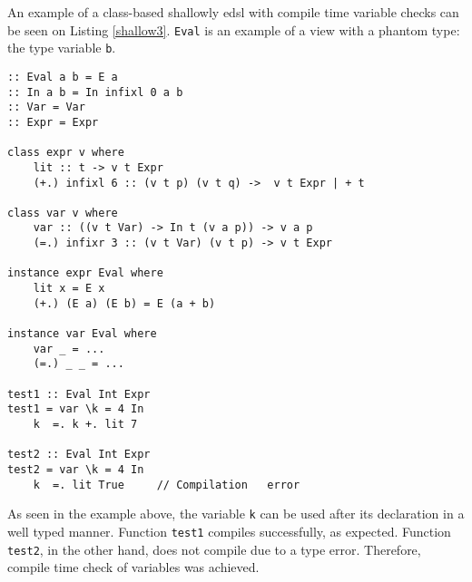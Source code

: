 An example of a class-based shallowly \ac{edsl} with compile time variable checks can be seen on Listing \ref{shallow3}. \texttt{Eval} is an example of a view with a phantom type: the type variable \texttt{b}.

\begin{lstlisting}[caption=A simple class-based shallowly \ac{edsl} with compile time variable checks,captionpos=b,label=shallow3]
:: Eval a b = E a
:: In a b = In infixl 0 a b
:: Var = Var
:: Expr = Expr

class expr v where
    lit :: t -> v t Expr
    (+.) infixl 6 :: (v t p) (v t q) ->  v t Expr | + t

class var v where
    var :: ((v t Var) -> In t (v a p)) -> v a p
    (=.) infixr 3 :: (v t Var) (v t p) -> v t Expr

instance expr Eval where
    lit x = E x
    (+.) (E a) (E b) = E (a + b)

instance var Eval where
    var _ = ...
    (=.) _ _ = ...

test1 :: Eval Int Expr
test1 = var \k = 4 In
    k  =. k +. lit 7

test2 :: Eval Int Expr
test2 = var \k = 4 In
    k  =. lit True     // Compilation   error
\end{lstlisting}

As seen in the example above, the variable \texttt{k} can be used after its declaration in a well typed manner. Function \texttt{test1} compiles successfully, as expected. Function \texttt{test2}, in the other hand, does not compile due to a type error. Therefore, compile time check of variables was achieved.

